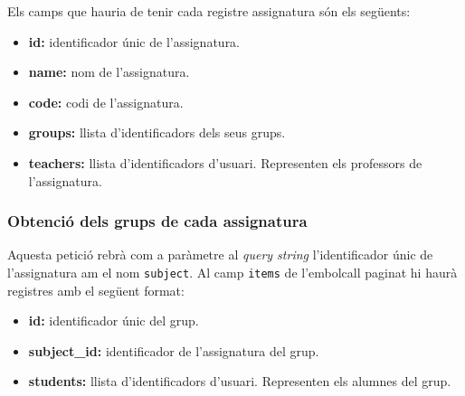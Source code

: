 	Els camps que hauria de tenir cada registre assignatura són els següents:
	
	\begin{itemize}
		
		\item \textbf{id:} identificador únic de l'assignatura.
		\item \textbf{name:} nom de l'assignatura.
		\item \textbf{code:} codi de l'assignatura.
		\item \textbf{groups:} llista d'identificadors dels seus grups.
		\item \textbf{teachers:} llista d'identificadors d'usuari. Representen els professors de l'assignatura.
	\end{itemize}

\subsubsection{Obtenció dels grups de cada assignatura}

	Aquesta petició rebrà com a paràmetre al \emph{query string} l'identificador únic de l'assignatura am el nom \texttt{subject}. Al camp \texttt{items} de l'embolcall paginat hi haurà registres amb el següent format:
	
	\begin{itemize}
		\item \textbf{id:} identificador únic del grup.
		\item \textbf{subject\_id:} identificador de l'assignatura del grup.
		\item \textbf{students:} llista d'identificadors d'usuari. Representen els alumnes del grup.
	\end{itemize}
	

		